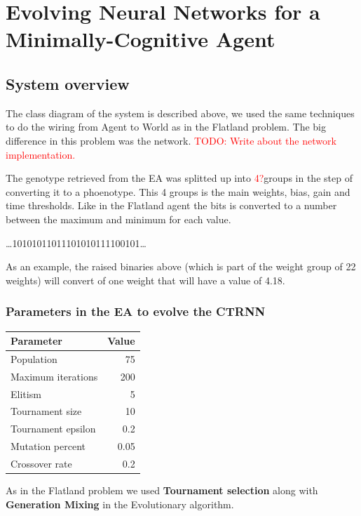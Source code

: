 \section{Evolving Neural Networks for a Minimally-Cognitive Agent}
\subsection{System overview}
The class diagram of the system is described above, we used the same techniques to do the wiring from Agent to World as in the Flatland problem. The big difference in this problem was the network. \textcolor{red}{TODO: Write about the network implementation.}


The genotype retrieved from the EA was splitted up into \textcolor{red}{4?}groups in the step of converting it to a phoenotype. This 4 groups is the main weights, bias, gain and time thresholds. Like in the Flatland agent the bits is converted to a number between the maximum and minimum for each value.

\begin{center}
\dots101010110{\LARGE11101010}111100101\dots
\end{center}

As an example, the raised binaries above (which is part of the weight group of 22 weights) will convert of one weight that will have a value of 4.18.

\subsubsection{Parameters in the EA to evolve the CTRNN}
\begin{center}
\begin{tabular}{p{5cm} | r}
\textbf{Parameter} & \textbf{Value} \\
\hline
Population & 75 \\
Maximum iterations & 200 \\
Elitism & 5 \\
Tournament size & 10 \\
Tournament epsilon & 0.2 \\
Mutation percent & 0.05 \\
Crossover rate & 0.2 \\
\hline
\end{tabular}
\end{center}

As in the Flatland problem we used \textbf{Tournament selection} along with \textbf{Generation Mixing} in the Evolutionary algorithm.

